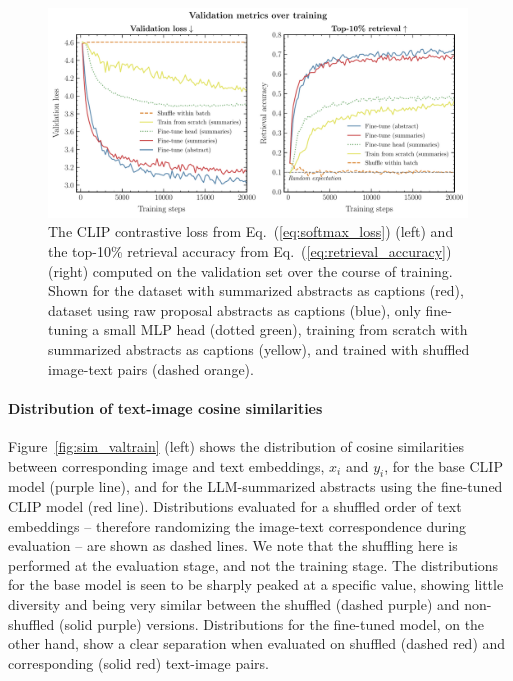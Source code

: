 \documentclass[10pt]{article} %
\newcommand{\eqrefb}[1]{(\ref{#1})}
\begin{document}
\begin{figure}[!h]
\includegraphics[width=0.99\textwidth]{plots/val_metrics.pdf}
\caption{The CLIP contrastive loss from Eq.~\eqrefb{eq:softmax_loss} (left) and the top-10\% retrieval accuracy from Eq.~\eqrefb{eq:retrieval_accuracy} (right) computed on the validation set over the course of training. Shown for the dataset with summarized abstracts as captions (red), dataset using raw proposal abstracts as captions (blue), only fine-tuning a small MLP head (dotted green), training from scratch with summarized abstracts as captions (yellow), and trained with shuffled image-text pairs (dashed orange).} 
\label{fig:retrieval_acc}
\end{figure}

\paragraph*{Distribution of text-image cosine similarities}

Figure~\ref{fig:sim_valtrain} (left) shows the distribution of cosine similarities between corresponding image and text embeddings, $x_i$ and $y_i$, for the base CLIP model (purple line), and for the LLM-summarized abstracts using the fine-tuned CLIP model (red line).
%
Distributions evaluated for a shuffled order of text embeddings -- therefore randomizing the image-text correspondence during evaluation -- are shown as dashed lines. We note that the shuffling here is performed at the evaluation stage, and not the training stage.
%
The distributions for the base model is seen to be sharply peaked at a specific value, showing little diversity and being very similar between the shuffled (dashed purple) and non-shuffled (solid purple) versions. 
%
Distributions for the fine-tuned model, on the other hand, show a clear separation when evaluated on shuffled (dashed red) and corresponding (solid red) text-image pairs.
\end{document}
